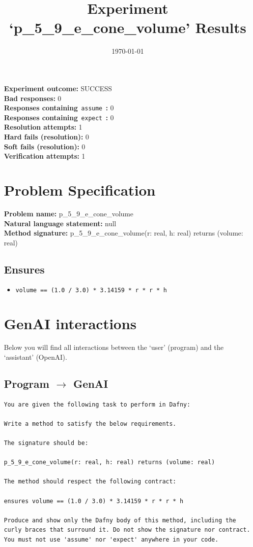 \documentclass{article}
\begin{document}
\title{Experiment `p\_5\_9\_e\_cone\_volume' Results}
\author{\today}
\date{}
\maketitle
\textbf{Experiment outcome: }SUCCESS
\\\textbf{Bad responses: }0
\\\textbf{Responses containing}~\texttt{assume}~\textbf{: }0
\\\textbf{Responses containing}~\texttt{expect}~\textbf{: }0
\\\textbf{Resolution attempts: }1
\\\textbf{Hard fails (resolution): }0
\\\textbf{Soft fails (resolution): }0
\\\textbf{Verification attempts: }1
\section*{Problem Specification}
\textbf{Problem name: }p\_5\_9\_e\_cone\_volume
\\\textbf{Natural language statement: }null
\\\textbf{Method signature: }p\_5\_9\_e\_cone\_volume(r: real, h: real) returns (volume: real)
\subsection*{Ensures}
\begin{itemize}
\item \texttt{volume == (1.0 / 3.0) * 3.14159 * r * r * h}
\end{itemize}
\clearpage
\section*{GenAI interactions}
Below you will find all interactions between the `user' (program) and the `assistant' (OpenAI).
\subsection*{Program $\rightarrow$ GenAI}
\begin{lstlisting}
You are given the following task to perform in Dafny:

Write a method to satisfy the below requirements.

The signature should be:

p_5_9_e_cone_volume(r: real, h: real) returns (volume: real)

The method should respect the following contract:

ensures volume == (1.0 / 3.0) * 3.14159 * r * r * h

Produce and show only the Dafny body of this method, including the curly braces that surround it. Do not show the signature nor contract. You must not use 'assume' nor 'expect' anywhere in your code.
\end{lstlisting}
\end{document}

